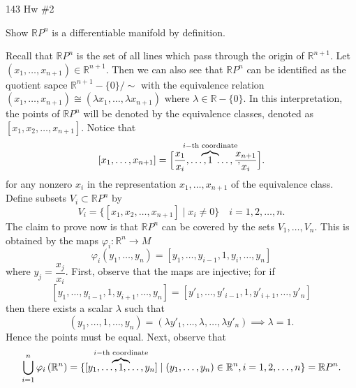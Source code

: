 \documentclass[12pt,letterpaper,boxed]{math_hw_pset}
\newcommand{\rr}{\mathbb{R}}
\renewcommand{\phi}{\varphi}
\begin{document}
\begin{center}
    143 Hw \#2
\end{center}

\begin{exercise}[Problem 1.]
    Show $\rr P^n$ is a differentiable manifold by definition.
\end{exercise}

\begin{solution}
    Recall that $\rr P^n$ is the set of all lines which pass through the origin 
    of $\rr^{n+1}$. 
    Let $(x_1, \dots, x_{n+1})\in \rr^{n+1}$. Then we can also 
    see that $\rr P^n$ can be identified as the quotient sapce $\rr^{n+1}-\{0\}/\sim$
    with the equivalence relation 
    $(x_1, \dots, x_{n+1}) \cong (\lambda x_1, \dots, \lambda x_{n+1})$ 
    where $\lambda \in \rr-\{0\}$. 
    In this interpretation, the points of $\rr P^n$ will be denoted 
    by the equivalence classes, denoted as $[x_1, x_2, \dots, x_{n+1}]$. 
    Notice that 
    \[
      [x_1, \dots, x_{n+1}] = \Big[\frac{x_1}{x_i}, \dots, \hspace{-0.9cm} \overbrace{1}^{i-\text{th coordinate}},\hspace{-0.9cm} \dots, \frac{x_{n+1}}{x_i}\Big].
    \]
    for any nonzero $x_i$ in the representation $x_1, \dots, x_{n+1}$ of the equivalence class.
    Define subsets $V_i \subset \rr P^n$ by 
    \[
        V_i = \{[x_1, x_2, \dots, x_{n+1}] \mid x_i \ne 0 \} \quad i = 1,2, \dots, n.
    \]
    The claim to prove now is that $\rr P^n$ can be covered by the sets $V_1, \dots, V_n$. 
    This is obtained by the maps 
    $\phi_i: \rr^n \to M$
    \[
        \phi_i(y_1,  \dots, y_n) = [y_1, \dots, y_{i-1}, 1, y_{i}, \dots, y_n] 
    \]
    where $y_{j} = \dfrac{x_j}{x_i}$. 
    First, observe that the maps are injective; for if
    \[
        [y_1, \dots, y_{i-1}, 1, y_{i+1}, \dots, y_n]
        =
        [y'_1, \dots, y'_{i-1}, 1, y'_{i+1}, \dots, y'_n]
    \]
    then there exists a scalar $\lambda$ such that 
    \[
        (y_1,  \dots, 1, \dots, y_n)
        =
        (\lambda y'_1,  \dots, \lambda, \dots, \lambda y'_n)
        \implies 
        \lambda = 1.
    \]
    Hence the points must be equal. 
    Next, observe that 
    \[
        \bigcup_{i=1}^{n}\phi_i\left( \rr^n \right)
        = 
        \{[y_1, \dots, \hspace{-0.9cm} \overbrace{1}^{i-\text{th coordinate}}\hspace{-0.9cm},  \dots, y_n] 
        \mid (y_1, \dots, y_n) \in \rr^n, i =  1,2, \dots, n\}
        = 
        \rr P^n.
\]
\end{solution}
\end{document}
